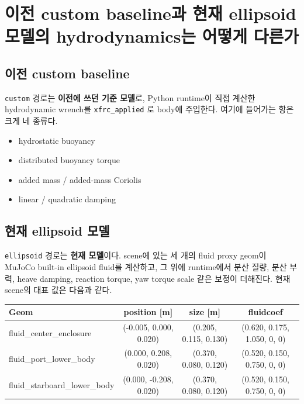 \documentclass[11pt,a4paper]{article}
\newcommand{\code}[1]{\nolinkurl{#1}}
\begin{document}
\section{이전 custom baseline과 현재 ellipsoid 모델의 hydrodynamics는 어떻게 다른가}

\subsection{이전 custom baseline}

\code{custom} 경로는 \textbf{이전에 쓰던 기준 모델}로, Python runtime이 직접 계산한 hydrodynamic wrench를 \code{xfrc\_applied} 로 body에 주입한다. 여기에 들어가는 항은 크게 네 종류다.

\begin{itemize}[leftmargin=2em]
  \item hydrostatic buoyancy
  \item distributed buoyancy torque
  \item added mass / added-mass Coriolis
  \item linear / quadratic damping
\end{itemize}

\subsection{현재 ellipsoid 모델}

\code{ellipsoid} 경로는 \textbf{현재 모델}이다. scene에 있는 세 개의 fluid proxy geom이 MuJoCo built-in ellipsoid fluid를 계산하고, 그 위에 runtime에서 분산 질량, 분산 부력, heave damping, reaction torque, yaw torque scale 같은 보정이 더해진다. 현재 scene의 대표 값은 다음과 같다.

\begin{center}
\small
\begin{tabular}{lccc}
\toprule
Geom & position [m] & size [m] & fluidcoef \\
\midrule
fluid\_center\_enclosure & (-0.005, 0.000, 0.020) & (0.205, 0.115, 0.130) & (0.620, 0.175, 1.050, 0, 0) \\
fluid\_port\_lower\_body & (0.000, 0.208, 0.020) & (0.370, 0.080, 0.120) & (0.520, 0.150, 0.750, 0, 0) \\
fluid\_starboard\_lower\_body & (0.000, -0.208, 0.020) & (0.370, 0.080, 0.120) & (0.520, 0.150, 0.750, 0, 0) \\
\bottomrule
\end{tabular}
\end{center}
\end{document}
